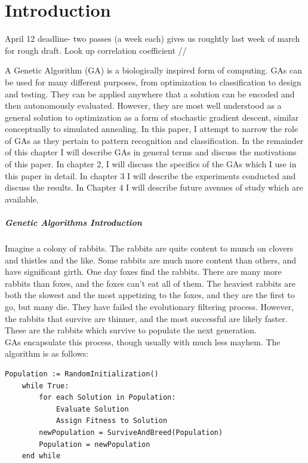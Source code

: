 \chapter{Introduction} \label{ch:introduction}

April 12 deadline- two passes (a week each) gives us roughtly last week of march for rough draft.  Look up correlation coefficient //

A Genetic Algorithm (GA) is a biologically inspired form of computing.  GAs can be used for many different purposes, from optimization to classification to design and testing.  They can be applied anywhere that a solution can be encoded and then autonomously evaluated.  However, they are most well understood as a general solution to optimization as a form of stochastic gradient descent, similar conceptually to simulated annealing. In this paper, I attempt to narrow the role of GAs as they pertain to pattern recognition and classification.  In the remainder of this chapter I will describe GAs in general terms and discuss the motivations of this paper.  In chapter 2, I will discuss the specifics of the GAs which I use in this paper in detail.  In chapter 3 I will describe the experiments conducted and discuss the results.  In Chapter 4 I will describe future avenues of study which are available. 
\paragraph{Genetic Algorithms Introduction}
Imagine a colony of rabbits.  The rabbits are quite content to munch on clovers and thistles and the like.  Some rabbits are much more content than others, and have significant girth.  One day foxes find the rabbits. There are many more rabbits than foxes, and the foxes can't eat all of them.  The heaviest rabbits are both the slowest and the most appetizing to the foxes, and they are the first to go, but many die.  They have failed the evolutionary filtering process.  However, the rabbits that survive are thinner, and the most successful are likely faster.  These are the rabbits which survive to populate the next generation.
\\GAs encapsulate this process, though usually with much less mayhem.  The algorithm is as follows:
\begin{lstlisting}[language = algorithm]
Population := RandomInitialization()
	while True:
		for each Solution in Population:
			Evaluate Solution
			Assign Fitness to Solution
		newPopulation = SurviveAndBreed(Population)
		Population = newPopulation
	end while
\end{lstlisting}

